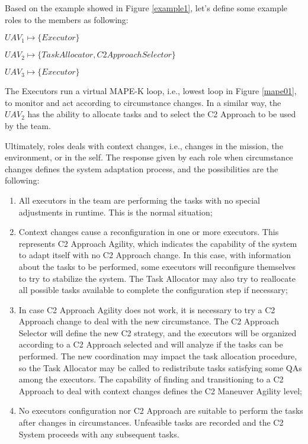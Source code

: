 


Based on the example showed in Figure \ref{example1}, let's define some example roles to the members as following:

\hspace{4cm} $UAV_1 \mapsto \{Executor\}$

\hspace{4cm} $UAV_2 \mapsto \{Task Allocator, C2 Approach Selector\}$

\hspace{4cm} $UAV_3 \mapsto \{Executor\}$

The Executors run a virtual MAPE-K loop, i.e., lowest loop in Figure \ref{mape01}, to monitor and act according to circumstance changes. In a similar way, the $UAV_2$ has the ability to allocate tasks and to select the C2 Approach to be used by the team.

Ultimately, roles deals with context changes, i.e., changes in the mission, the environment, or in the self. The response given by each role  when circumstance changes defines the system adaptation process, and the possibilities are the following:

\begin{enumerate}
    \item All executors in the team  are performing the tasks with no special adjustments in runtime. This is the normal situation;
    \item Context changes cause a reconfiguration in one or more executors. This represents C2 Approach Agility, which indicates the capability of the system to adapt itself with no C2 Approach change. In this case, with information about the tasks to be performed, some executors will reconfigure themselves to try to stabilize the system. The Task Allocator may also try to reallocate all possible tasks available to complete the configuration step if necessary;
    \item In case C2 Approach Agility does not work, it is necessary to try a C2 Approach change to deal with the new circumstance. The C2 Approach Selector will define the new C2 strategy, and the executors will be organized according to a C2 Approach selected and will analyze if the tasks can be performed. The new coordination may impact the task allocation procedure, so the Task Allocator may be called to redistribute tasks satisfying some QAs among the executors. The capability of finding and transitioning to a C2 Approach to deal with context changes defines the C2 Maneuver Agility level;
    \item No executors configuration nor C2 Approach are suitable to perform the tasks after changes in circumstances. Unfeasible tasks are recorded and the C2 System proceeds with any subsequent tasks.
\end{enumerate}


